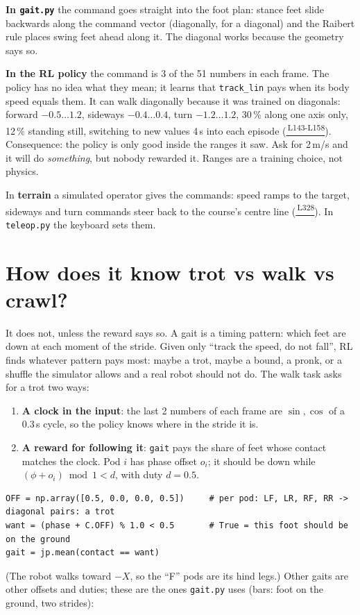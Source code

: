 \documentclass[10pt,letterpaper]{article}
\newcommand{\repo}{https://github.com/soujanya957/capstan-drive-leg/blob/231ca53/CapstanPedal/fullbuild_v4}
\newcommand{\gh}[2]{\href{\repo/#1\##2}{\texttt{\detokenize{#1}}\,\textsuperscript{\tiny #2}}}
\newcommand{\key}[1]{\textbf{#1}}
\begin{document}
\textbf{In \texttt{gait.py}} the command goes straight into the foot plan: stance feet slide backwards along the command vector
(diagonally, for a diagonal) and the Raibert rule places swing feet ahead along it. The diagonal works because the geometry says so.

\textbf{In the RL policy} the command is 3 of the 51 numbers in each frame. The policy has no idea what they mean; it learns that
\texttt{track\_lin} pays when its body speed equals them. It can walk diagonally because it was trained on diagonals: forward
$-0.5\ldots1.2$, sideways $-0.4\ldots0.4$, turn $-1.2\ldots1.2$, 30\,\% along one axis only, 12\,\% standing still, switching to new
values 4\,s into each episode (\gh{rl2/tasks.py}{L143-L158}). Consequence: the policy is only good inside the ranges it saw. Ask for
2\,m/s and it will do \emph{something}, but nobody rewarded it. Ranges are a training choice, not physics.

In \textbf{terrain} a simulated operator gives the commands: speed ramps to the target, sideways and turn commands steer back to the
course's centre line (\gh{rl2/tasks.py}{L328}). In \texttt{teleop.py} the keyboard sets them.

\section{How does it know trot vs walk vs crawl?}\label{sec:gaits}

It does not, unless the reward says so. A gait is a timing pattern: which feet are down at each moment of the stride. Given only
``track the speed, do not fall'', RL finds whatever pattern pays most: maybe a trot, maybe a bound, a pronk, or a shuffle the
simulator allows and a real robot should not do. The walk task asks for a trot two ways:
\begin{enumerate}
\item \key{A clock in the input}: the last 2 numbers of each frame are $\sin,\cos$ of a 0.3\,s cycle, so the policy knows where in
the stride it is.
\item \key{A reward for following it}: \texttt{gait} pays the share of feet whose contact matches the clock. Pod $i$ has phase offset
$o_i$; it should be down while $(\phi+o_i)\bmod 1 < d$, with duty $d=0.5$.
\end{enumerate}
\begin{lstlisting}
OFF = np.array([0.5, 0.0, 0.0, 0.5])     # per pod: LF, LR, RF, RR -> diagonal pairs: a trot
want = (phase + C.OFF) % 1.0 < 0.5       # True = this foot should be on the ground
gait = jp.mean(contact == want)
\end{lstlisting}
(The robot walks toward $-X$, so the ``F'' pods are its hind legs.) Other gaits are other offsets and duties; these are the ones
\texttt{gait.py} uses (bars: foot on the ground, two strides):
\end{document}
